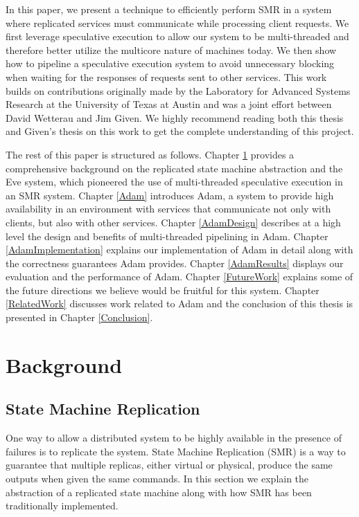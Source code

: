 \documentclass[11pt, oneside]{report}
\begin{document}
In this paper, we present a technique to efficiently perform SMR in a system where replicated services must communicate while processing client requests.
We first leverage speculative execution \cite{eve, zyz} to allow our system to be multi-threaded and therefore better utilize the multicore nature of machines today. 
We then show how to pipeline a speculative execution system to avoid unnecessary blocking when waiting for the responses of requests sent to other services.
This work builds on contributions originally made by the Laboratory for Advanced Systems Research at the University of Texas at Austin \cite{eve, manosThesis} and was a joint effort between David Wetterau and Jim Given. 
We highly recommend reading both this thesis and Given's thesis \cite{jim} on this work to get the complete understanding of this project.

The rest of this paper is structured as follows. 
Chapter \ref{Background} provides a comprehensive background on the replicated state machine abstraction and the Eve system, which pioneered the use of multi-threaded speculative execution in an SMR system. 
Chapter \ref{Adam} introduces Adam, a system to provide high availability in an environment with services that communicate not only with clients, but also with other services. 
Chapter \ref{AdamDesign} describes at a high level the design and benefits of multi-threaded pipelining in Adam. 
Chapter \ref{AdamImplementation} explains our implementation of Adam in detail along with the correctness guarantees Adam provides. 
Chapter \ref{AdamResults} displays our evaluation and the performance of Adam. 
Chapter \ref{FutureWork} explains some of the future directions we believe would be fruitful for this system.
Chapter \ref{RelatedWork} discusses work related to Adam and the conclusion of this thesis is presented in Chapter \ref{Conclusion}.

\chapter{Background}\label{Background}
\section{State Machine Replication}
One way to allow a distributed system to be highly available in the presence of failures is to replicate the system.
State Machine Replication (SMR) is a way to guarantee that multiple replicas, either virtual or physical, produce the same outputs when given the same commands. 
In this section we explain the abstraction of a replicated state machine along with how SMR has been traditionally implemented.
\end{document}
